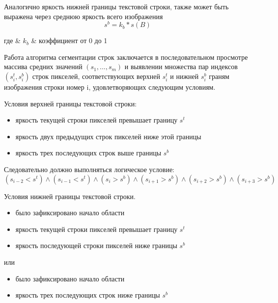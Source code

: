 Аналогично яркость нижней границы текстовой строки, также может быть выражена через среднюю яркость всего изображения
\begin{equation}
  \label{eq:architecture:line_down_interval_medium_brigth}
  s^{b} = k_{b} * s(B)
\end{equation}
\begin{explanation}
где & $ k_{b} $ & коэффициент от 0 до 1
\end{explanation}

Работа алгоритма сегментации строк заключается в последовательном просмотре массива средних значений $ (s_1,...,s_m) $ и выявлении множества пар индексов $ (s^t_i,s^b_i) $ строк пикселей, соответствующих верхней $ s^t_i $ и нижней $ s^b_i $ граням изображения строки номер i, удовлетворяющих следующим условиям.

Условия верхней границы текстовой строки:
\begin{itemize}
  \item яркость текущей строки пикселей превышает границу $ s^{t} $
  \item яркость двух предыдущих строк пикселей ниже этой границы
  \item яркость трех последующих строк выше границы $ s^{b} $
\end{itemize}

Следовательно должно выполняться логическое условие:
\begin{equation}
  \label{eq:architecture:logic_up_interval}
  (s_{i-2} < s^{t}) \wedge (s_{i-1} < s^{t}) \wedge (s_i > s^{b}) \wedge (s_{i+1} > s^{b}) \wedge (s_{i+2} > s^{b}) \wedge (s_{i+3} > s^{b})
\end{equation}

Условия нижней границы текстовой строки.
\begin{itemize}     
  \item было зафиксировано начало области
  \item яркость текущей строки пикселей превышает границу $ s^{t} $
  \item яркость последующей строки пикселей ниже границы $ s^{b} $
\end{itemize}
     
или

\begin{itemize}
   \item было зафиксировано начало области
   \item яркость трех последующих строк ниже границы $ s^{b} $
\end{itemize}

